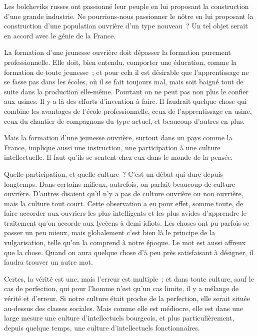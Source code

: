 \documentclass[french,twoside]{book} %
\begin{document}
Les bolcheviks russes ont passionné leur peuple en lui proposant la construction d'une grande industrie. Ne pourrions-nous passionner le nôtre en lui proposant la construction d'une population ouvrière d'un type nouveau ? Un tel objet serait en accord avec le génie de la France.\par
La formation d'une jeunesse ouvrière doit dépasser la formation purement professionnelle. Elle doit, bien entendu, comporter une éducation, comme la formation de toute jeunesse ; et pour cela il est désirable que l'apprentissage ne se fasse pas dans les écoles, où il se fait toujours mal, mais soit baigné tout de suite dans la production elle-même. Pourtant on ne peut pas non plus le confier aux usines. Il y a là des efforts d'invention à faire. Il faudrait quelque chose qui combine les avantages de l'école professionnelle, ceux de l'apprentissage en usine, ceux du chantier de compagnons du type actuel, et beaucoup d'autres en plus.\par
Mais la formation d'une jeunesse ouvrière, surtout dans un pays comme la France, implique aussi une instruction, une participation à une culture intellectuelle. Il faut qu'ils se sentent chez eux dans le monde de la pensée.\par
\par
Quelle participation, et quelle culture ? C'est un débat qui dure depuis longtemps. Dans certains milieux, autrefois, on parlait beaucoup de culture ouvrière. D'autres disaient qu'il n'y a pas de culture ouvrière ou non ouvrière, mais la culture tout court. Cette observation a eu pour effet, somme toute, de faire accorder aux ouvriers les plus intelligents et les plus avides d'apprendre le traitement qu'on accorde aux lycéens à demi idiots. Les choses ont pu parfois se passer un peu mieux, mais globalement c'est bien là le principe de la vulgarisation, telle qu'on la comprend à notre époque. Le mot est aussi affreux que la chose. Quand on aura quelque chose d'à peu près satisfaisant à désigner, il faudra trouver un autre mot.\par
Certes, la vérité est une, mais l'erreur est multiple ; et dans toute culture, sauf le cas de perfection, qui pour l'homme n'est qu'un cas limite, il y a mélange de vérité et d'erreur. Si notre culture était proche de la perfection, elle serait située au-dessus des classes sociales. Mais comme elle est médiocre, elle est dans une large mesure une culture d'intellectuels bourgeois, et plus particulièrement, depuis quelque temps, une culture d'intellectuels fonctionnaires.\par
\end{document}
